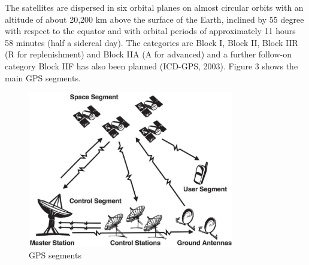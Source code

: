 The satellites are dispersed in six orbital planes on almost circular orbits with an 
altitude of about 20,200 km above the surface of the Earth, inclined by 55 degree with
respect to the equator and with orbital periods of approximately 11 hours 58 minutes 
(half a sidereal day).
The categories are Block I, Block II, Block IIR (R for replenishment) and Block IIA (A for
advanced) and a further follow-on category Block IIF has also been planned (ICD-GPS, 2003).
Figure 3 shows the main GPS segments.
\begin{figure}[htb] 
	\label{fig:gps_segments}
	\centering
	\includegraphics[width=0.8\textwidth]{figures/gps_segments}
	\caption{GPS segments}
\end{figure}


